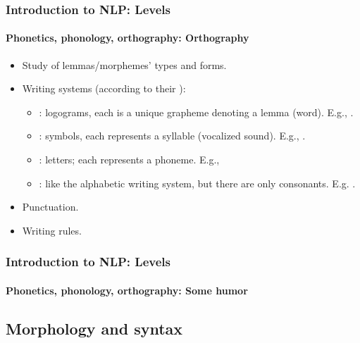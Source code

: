 \documentclass[xcolor=table]{beamer}
\begin{document}
\begin{frame}
\frametitle{Introduction to NLP: Levels}
\framesubtitle{Phonetics, phonology, orthography: Orthography}


\begin{itemize}
	\item Study of lemmas/morphemes' types and forms.
	\item Writing systems (according to their ): 
	\begin{itemize}
		\item {}: logograms, each is a unique grapheme denoting a lemma (word).
		E.g., .
		\item {}: symbols, each represents a syllable (vocalized sound).
		E.g., .
		\item {}: letters; each represents a phoneme.
		E.g., 
		\item {}: like the alphabetic writing system, but there are only consonants. 
		E.g. .
	\end{itemize}
	\item Punctuation.
	\item Writing rules.
\end{itemize}

\end{frame}

\begin{frame}
\frametitle{Introduction to NLP: Levels}
\framesubtitle{Phonetics, phonology, orthography: Some humor}

\begin{center}
\end{center}

\end{frame}

\subsection{Morphology and syntax}
\end{document}
